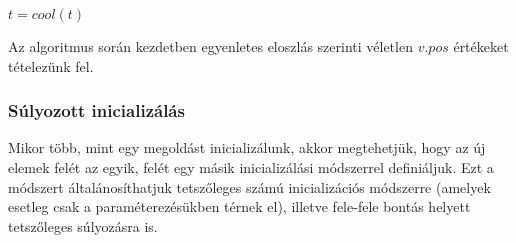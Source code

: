 \begin{algorithm}[H]
\begin{algorithmic}[1]
	\STATE $t = cool(t)$ 
\ENDFOR
\end{algorithmic}
\end{algorithm}

Az algoritmus során kezdetben egyenletes eloszlás szerinti véletlen $v.pos$ értékeket tételezünk fel.




%
%

\subsubsection{Súlyozott inicializálás}

Mikor több, mint egy megoldást inicializálunk, akkor megtehetjük, hogy az új elemek felét az egyik, felét egy másik inicializálási módszerrel definiáljuk. Ezt a módszert általánosíthatjuk tetszőleges számú inicializációs módszerre (amelyek esetleg csak a paraméterezésükben térnek el), illetve fele-fele bontás helyett tetszőleges súlyozásra is.


